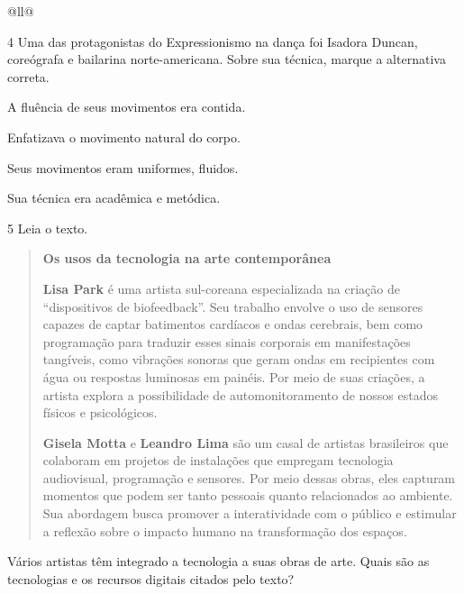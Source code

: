 \begin{itemize}
\begin{itemize}
\begin{escolha}[]{@{}ll@{}}

\num{4} Uma das protagonistas do Expressionismo na dança foi Isadora Duncan,
coreógrafa e bailarina norte-americana. Sobre sua técnica, marque a
alternativa correta.

\begin{boxlist}
\item A fluência de seus movimentos era contida.

\item Enfatizava o movimento natural do corpo. 

\item Seus movimentos eram uniformes, fluidos.

\item Sua técnica era acadêmica e metódica.
\end{boxlist}

\num{5} Leia o texto.

\begin{quote}
\textbf{Os usos da tecnologia na arte contemporânea}

\textbf{Lisa Park} é uma artista sul-coreana especializada na criação de
``dispositivos de biofeedback''. Seu trabalho envolve o uso de 
sensores capazes de captar batimentos cardíacos e ondas cerebrais, 
bem como programação para traduzir esses sinais corporais em 
manifestações tangíveis, como vibrações sonoras que geram ondas 
em recipientes com água ou respostas luminosas em painéis. Por meio 
de suas criações, a artista explora a possibilidade de automonitoramento 
de nossos estados físicos e psicológicos.

\textbf{Gisela Motta} e \textbf{Leandro Lima} são um casal de artistas brasileiros que 
colaboram em projetos de instalações que empregam tecnologia audiovisual, 
programação e sensores. Por meio dessas obras, eles capturam momentos 
que podem ser tanto pessoais quanto relacionados ao ambiente. Sua abordagem 
busca promover a interatividade com o público e estimular a reflexão sobre 
o impacto humano na transformação dos espaços.

\end{quote}

Vários artistas têm integrado a tecnologia a suas obras de arte. Quais
são as tecnologias e os recursos digitais citados pelo texto?


\end{escolha}
\end{itemize}
\end{itemize}
